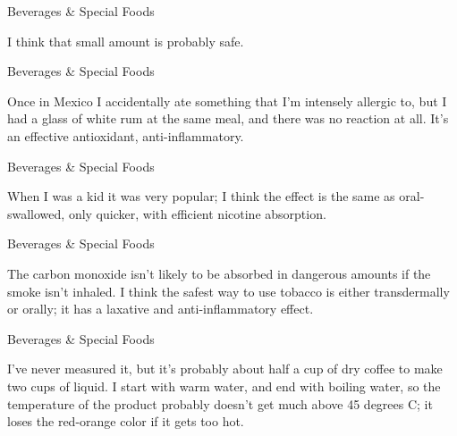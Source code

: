 \documentclass[11pt,oneside,openany,extrafontsizes]{memoir}
\begin{document}
\begin{standalonequote}{Beverages \& Special Foods}

    \begin{answer}
      I think that small amount is probably safe.
    \end{answer}
\end{standalonequote}

\begin{standalonequote}{Beverages \& Special Foods}

    \begin{answer}
      Once in Mexico I accidentally ate something that I'm intensely allergic to, but I had a glass of white rum at the same meal, and there was no reaction at all. It's an effective antioxidant, anti-inflammatory.
    \end{answer}
\end{standalonequote}

\begin{standalonequote}{Beverages \& Special Foods}

    \begin{answer}
      When I was a kid it was very popular; I think the effect is the same as oral-swallowed, only quicker, with efficient nicotine absorption.
    \end{answer}
\end{standalonequote}

\begin{standalonequote}{Beverages \& Special Foods}

    \begin{answer}
      The carbon monoxide isn't likely to be absorbed in dangerous amounts if the smoke isn't inhaled. I think the safest way to use tobacco is either transdermally or orally; it has a laxative and anti-inflammatory effect.
    \end{answer}
\end{standalonequote}

\begin{standalonequote}{Beverages \& Special Foods}

    \begin{answer}
      I've never measured it, but it's probably about half a cup of dry coffee to make two cups of liquid. I start with warm water, and end with boiling water, so the temperature of the product probably doesn't get much above 45 degrees C; it loses the red-orange color if it gets too hot.
    \end{answer}
\end{standalonequote}
\end{document}
